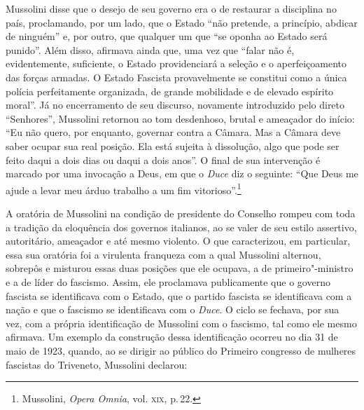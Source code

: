 Mussolini disse que o desejo de seu governo era o de restaurar a
disciplina no país, proclamando, por um lado, que o Estado ``não
pretende, a princípio, abdicar de ninguém'' e, por outro, que qualquer um
que ``se oponha ao Estado será punido''. Além disso, afirmava ainda que,
uma vez que ``falar não é, evidentemente, suficiente, o Estado
providenciará a seleção e o aperfeiçoamento das forças armadas. O Estado
Fascista provavelmente se constitui como a única polícia perfeitamente
organizada, de grande mobilidade e de elevado espírito moral''. Já no
encerramento de seu discurso, novamente introduzido pelo direto
``Senhores'', Mussolini retornou ao tom desdenhoso, brutal e ameaçador
do início: ``Eu não quero, por enquanto, governar contra a Câmara. Mas a
Câmara deve saber ocupar sua real posição. Ela está sujeita à
dissolução, algo que pode ser feito daqui a dois dias ou daqui a dois
anos''. O final de sua intervenção é marcado por uma invocação a Deus, em
que o \emph{Duce} diz o seguinte: ``Que Deus me ajude a levar meu árduo
trabalho a um fim vitorioso''.\footnote{Mussolini, \emph{Opera Omnia},
  vol. \textsc{xix}, p.\,22.}

A oratória de Mussolini na condição de presidente do Conselho rompeu com
toda a tradição da eloquência dos governos italianos, ao se valer de seu
estilo assertivo, autoritário, ameaçador e até mesmo violento. O que
caracterizou, em particular, essa sua oratória foi a virulenta franqueza
com a qual Mussolini alternou, sobrepôs e misturou essas duas posições
que ele ocupava, a de primeiro"-ministro e a de líder do fascismo. Assim,
ele proclamava publicamente que o governo fascista se identificava com o
Estado, que o partido fascista se identificava com a nação e que o
fascismo se identificava com o \emph{Duce}. O ciclo se fechava, por sua
vez, com a própria identificação de Mussolini com o fascismo, tal como
ele mesmo afirmava. Um exemplo da construção dessa identificação ocorreu
no dia 31 de maio de 1923, quando, ao se dirigir ao público do Primeiro
congresso de mulheres fascistas do Triveneto, Mussolini declarou:

